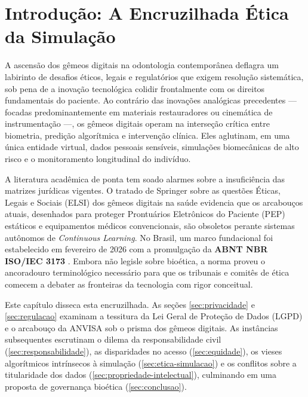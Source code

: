 \section{Introdução: A Encruzilhada Ética da Simulação}

A ascensão dos gêmeos digitais na odontologia contemporânea deflagra um labirinto de desafios éticos, legais e regulatórios que exigem resolução sistemática, sob pena de a inovação tecnológica colidir frontalmente com os direitos fundamentais do paciente. Ao contrário das inovações analógicas precedentes — focadas predominantemente em materiais restauradores ou cinemática de instrumentação —, os gêmeos digitais operam na interseção crítica entre biometria, predição algorítmica e intervenção clínica. Eles aglutinam, em uma única entidade virtual, dados pessoais sensíveis, simulações biomecânicas de alto risco e o monitoramento longitudinal do indivíduo.

A literatura acadêmica de ponta tem soado alarmes sobre a insuficiência das matrizes jurídicas vigentes. O tratado de Springer \cite{springer2026realising} sobre as questões Éticas, Legais e Sociais (ELSI) dos gêmeos digitais na saúde evidencia que os arcabouços atuais, desenhados para proteger Prontuários Eletrônicos do Paciente (PEP) estáticos e equipamentos médicos convencionais, são obsoletos perante sistemas autônomos de \textit{Continuous Learning}. No Brasil, um marco fundacional foi estabelecido em fevereiro de 2026 com a promulgação da \textbf{ABNT NBR ISO/IEC 3173} \cite{abinc2026brasil}. Embora não legisle sobre bioética, a norma proveu o ancoradouro terminológico necessário para que os tribunais e comitês de ética comecem a debater as fronteiras da tecnologia com rigor conceitual.

Este capítulo disseca esta encruzilhada. As seções \ref{sec:privacidade} e \ref{sec:regulacao} examinam a tessitura da Lei Geral de Proteção de Dados (LGPD) e o arcabouço da ANVISA sob o prisma dos gêmeos digitais. As instâncias subsequentes escrutinam o dilema da responsabilidade civil (\ref{sec:responsabilidade}), as disparidades no acesso (\ref{sec:equidade}), os vieses algorítmicos intrínsecos à simulação (\ref{sec:etica-simulacao}) e os conflitos sobre a titularidade dos dados (\ref{sec:propriedade-intelectual}), culminando em uma proposta de governança bioética (\ref{sec:conclusao}).
